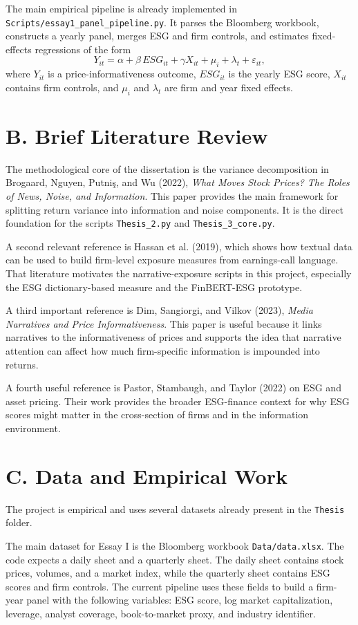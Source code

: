 \documentclass[12pt]{article}
\begin{document}
The main empirical pipeline is already implemented in \texttt{Scripts/essay1\_panel\_pipeline.py}. It parses the Bloomberg workbook, constructs a yearly panel, merges ESG and firm controls, and estimates fixed-effects regressions of the form
\[
Y_{it} = \alpha + \beta \, ESG_{it} + \gamma X_{it} + \mu_i + \lambda_t + \varepsilon_{it},
\]
where $Y_{it}$ is a price-informativeness outcome, $ESG_{it}$ is the yearly ESG score, $X_{it}$ contains firm controls, and $\mu_i$ and $\lambda_t$ are firm and year fixed effects.

\section*{B. Brief Literature Review}
The methodological core of the dissertation is the variance decomposition in Brogaard, Nguyen, Putni\c{s}, and Wu (2022), \emph{What Moves Stock Prices? The Roles of News, Noise, and Information}. This paper provides the main framework for splitting return variance into information and noise components. It is the direct foundation for the scripts \texttt{Thesis\_2.py} and \texttt{Thesis\_3\_core.py}.

A second relevant reference is Hassan et al. (2019), which shows how textual data can be used to build firm-level exposure measures from earnings-call language. That literature motivates the narrative-exposure scripts in this project, especially the ESG dictionary-based measure and the FinBERT-ESG prototype.

A third important reference is Dim, Sangiorgi, and Vilkov (2023), \emph{Media Narratives and Price Informativeness}. This paper is useful because it links narratives to the informativeness of prices and supports the idea that narrative attention can affect how much firm-specific information is impounded into returns.

A fourth useful reference is Pastor, Stambaugh, and Taylor (2022) on ESG and asset pricing. Their work provides the broader ESG-finance context for why ESG scores might matter in the cross-section of firms and in the information environment.

\section*{C. Data and Empirical Work}
The project is empirical and uses several datasets already present in the \texttt{Thesis} folder.

The main dataset for Essay I is the Bloomberg workbook \texttt{Data/data.xlsx}. The code expects a daily sheet and a quarterly sheet. The daily sheet contains stock prices, volumes, and a market index, while the quarterly sheet contains ESG scores and firm controls. The current pipeline uses these fields to build a firm-year panel with the following variables: ESG score, log market capitalization, leverage, analyst coverage, book-to-market proxy, and industry identifier.
\end{document}
